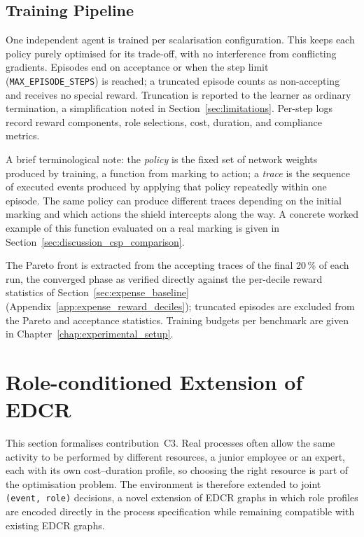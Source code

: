 \subsection{Training Pipeline}
\label{sec:training_pipeline}

One independent agent is trained per scalarisation configuration.
This keeps each policy purely optimised for its trade-off, with no
interference from conflicting gradients. Episodes end on acceptance
or when the step limit (\texttt{MAX\_EPISODE\_STEPS}) is reached; a truncated episode counts as non-accepting and receives no special reward. Truncation is reported to the learner as ordinary
termination, a simplification noted in Section~\ref{sec:limitations}.
Per-step logs record reward components, role selections, cost,
duration, and compliance metrics.

A brief terminological note: the \emph{policy} is the fixed set of
network weights produced by training, a function from marking to
action; a \emph{trace} is the sequence of executed events produced by
applying that policy repeatedly within one episode. The same policy
can produce different traces depending on the initial marking and
which actions the shield intercepts along the way. A concrete
worked example of this function evaluated on a real marking is given in Section~\ref{sec:discussion_csp_comparison}.


The Pareto front is extracted from the accepting traces of the final
20\,\% of each run, the converged phase as verified directly against
the per-decile reward statistics of Section~\ref{sec:expense_baseline}
(Appendix~\ref{app:expense_reward_deciles}); truncated episodes are excluded from the Pareto and acceptance statistics. Training budgets per
benchmark are given in Chapter~\ref{chap:experimental_setup}.

\section{Role-conditioned Extension of \ac{EDCR}}
\label{sec:roles}

This section formalises contribution~C3. Real processes often allow
the same activity to be performed by different resources, a junior
employee or an expert, each with its own cost--duration profile, so
choosing the right resource is part of the optimisation problem. The
environment is therefore extended to joint \texttt{(event, role)}
decisions, a novel extension of \ac{EDCR} graphs in which role
profiles are encoded directly in the process specification while
remaining compatible with existing \ac{EDCR} graphs.

